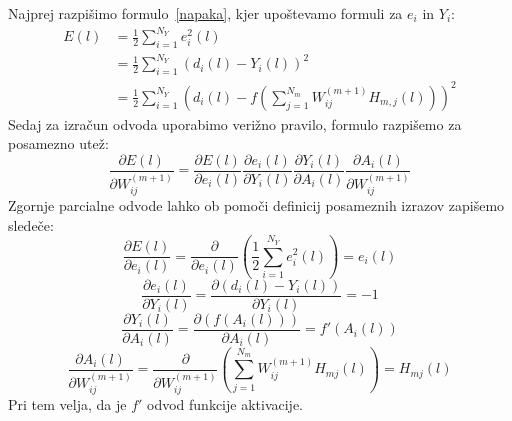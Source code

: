 \documentclass[mat1]{fmfdelo}
\begin{document}
Najprej razpišimo formulo~\eqref{napaka}, kjer upoštevamo formuli za $e_i$ in $Y_i$:
\begin{equation*}
\begin{aligned}
E(l) &= \frac{1}{2}\sum^{N_Y}_{i=1}e_i^2(l) \\
&=\frac{1}{2}\sum^{N_Y}_{i=1}{\left(d_i(l) - Y_i(l)\right)}^2 \\
&= \frac{1}{2}\sum^{N_Y}_{i=1}\left(d_i(l)-f\left(\sum^{N_m}_{j=1}W^{(m+1)}_{ij}H_{m,j}(l)\right)\right)^2
\end{aligned}
\end{equation*}
%
 Sedaj za izračun odvoda uporabimo verižno pravilo, formulo razpišemo za posamezno utež:
%
\begin{equation}
\frac{\partial E(l)}{\partial W^{(m+1)}_{ij}} = \frac{\partial E(l)}{\partial e_i(l)}
\frac{\partial e_i(l)}{\partial Y_i(l)} 
\frac{\partial Y_i(l)}{\partial A_i(l)}
\frac{\partial A_i(l)}{\partial W^{(m+1)}_{ij}}
\end{equation}
%
Zgornje parcialne odvode lahko ob pomoči definicij posameznih izrazov zapišemo sledeče:
%
\begin{equation}
\frac{\partial E(l)}{\partial e_i(l)} = \frac{\partial}{\partial e_i(l)}\left(\frac{1}{2}\sum^{N_Y}_{i=1}e_i^2(l)\right)=e_i(l)
\end{equation}
%
\begin{equation}
\frac{\partial e_i(l)}{\partial Y_i(l)}= \frac{\partial (d_i(l) - Y_i(l))}{\partial Y_i(l)} = -1
\end{equation}
%
\begin{equation}
\frac{\partial Y_i(l)}{\partial A_i(l)} = \frac{\partial (f(A_i(l))) }{\partial A_i(l)} =f'(A_i(l))
\end{equation}
%
\begin{equation}
\frac{\partial A_i(l)}{\partial W^{(m+1)}_{ij}} =\frac{\partial}{\partial W^{(m+1)}_{ij}} \left(\sum^{N_m}_{j=1}W_{ij}^{(m+1)}H_{mj}(l)\right) = H_{mj}(l)
\end{equation}
%
Pri tem velja, da je $f'$ odvod funkcije aktivacije. 
\end{document}
